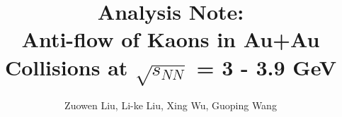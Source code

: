 \documentclass[preprint,showpacs,aps,prc,superscriptaddress]{revtex4-1}
\begin{document}

\title{
\Huge{Analysis Note: \\ \textbf{Anti-flow of Kaons in Au+Au Collisions at $\sqrt{s_{NN}}$ = 3 - 3.9 GeV}}
}
\author{\Large{Zuowen Liu, Li-ke Liu, Xing Wu, Guoping Wang}}



\newpage

\maketitle
\tableofcontents

\clearpage

\newpage





\clearpage

\newpage

\appendix


\clearpage


\newpage



\clearpage
\end{document}
